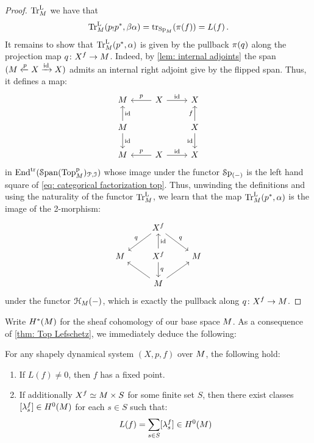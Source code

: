 \begin{proof}
    $\mathrm{Tr}^{\mathrm{L}}_{M}$ we have that
    \[ \TrcL(p_!p^*,\beta\alpha)= \tr{\pb{f}}{\pSp{\base}} = L(f)\,.\]
    It remains to show that $\mathrm{Tr}^{\mathrm{L}}_{M}(p^*,\alpha)$ is given
    by the pullback $\pi(q)$ along the projection 
    map $q\colon X^{f}\to M$.
    Indeed, by \autoref{lem: internal adjoints} the span 
    $(M \xleftarrow{p} X \xrightarrow{\operatorname{id}} X)$ admits an internal
    right adjoint give by the flipped span. Thus, it defines a map:
    \[
    \begin{tikzcd}
	\base & X & X \\
	\base && X \\
	\base & X & X 
	\arrow["p"', from=1-2, to=1-1]
	\arrow["\id", from=1-2, to=1-3]
	\arrow["\id"', from=2-1, to=1-1]
	\arrow["\id", from=2-1, to=3-1]
	\arrow["f", from=2-3, to=1-3]
	\arrow["\id"', from=2-3, to=3-3]
	\arrow["p"', from=3-2, to=3-1]
	\arrow["\id", from=3-2, to=3-3]
\end{tikzcd}
\]
in $\mathrm{End}^{\mathrm{tr}}(\operatorname{\mathcal S\mathrm{pan}}({\mathrm{Top}^{\mathrm{p}}_{M}})_{\mathcal{P},\mathcal{I}})$ whose image under the functor 
$\pSpf{(-)}$ is the left hand square of \eqref{eq: categorical factorization top}. Thus, unwinding the definitions and using the naturality of the
functor $\mathrm{Tr}^{\mathrm{L}}_{M}$, we learn that the map $\mathrm{Tr}^{\mathrm{L}}_{M}(p^*,\alpha)$
is the image of the 2-morphism: 
\[
\begin{tikzcd}
	& {X^f} & \\
	\base & {X^f} & \base \\
	& \base
	\arrow["q"', from=1-2, to=2-1]
	\arrow["q", from=1-2, to=2-3]
	\arrow["\id"', from=2-2, to=1-2]
	\arrow["q", from=2-2, to=3-2]
	\arrow[from=3-2, to=2-1]
	\arrow[from=3-2, to=2-3]
\end{tikzcd}
\]
under the functor $\cptSec{-}[\base]$, which is exactly the pullback along 
$q\colon X^f \to M$. 
\end{proof}

Write $H^*(M)$ for the sheaf cohomology of our base space $M$.
As a consequence of \cref{thm: Top Lefschetz}, we immediately deduce the following: 

\begin{cor}\label{cor: Lefschetz finite fixed pts}
  For any shapely dynamical system $(X,p,f)$ over $M$, the following hold:
  \begin{enumerate}
    \item If $L(f)\neq 0$, then $f$ has a fixed point.
    \item If additionally  $X^f\simeq M \times S$ for some finite set $S$, then 
      there exist classes $[\lambda^f_s]\in H^0(M)$ for each $s\in S$ such that:
  \[ L(f)= \sum_{s\in S}[\lambda_s^f]\in H^{0}(M)\]
  \end{enumerate}
\end{cor}

